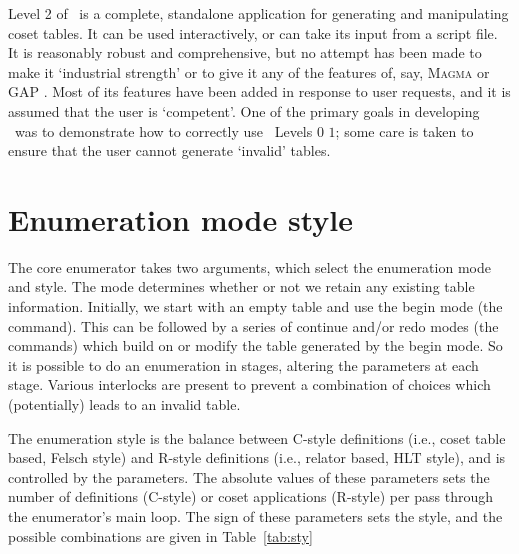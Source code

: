 


Level 2 of \ace\ is a complete, standalone application for generating and
  manipulating coset tables.
It can be used interactively, or can take its input from a script file.
It is reasonably robust and comprehensive, but no attempt has been made to
  make it `industrial strength' or to give it any of the features of, say,
  \textsc{Magma} \cite{Magma} or \textsf{GAP} \cite{GAP}.
Most of its features have been added in response to user requests, and it
  is assumed that the user is `competent'\kern-1.5pt.
One of the primary goals in developing \ace\ was to demonstrate how to
  correctly use \ace\ Levels $0$ \amp $1$; some care is taken to ensure
  that the user cannot generate `invalid' tables.

\section{Enumeration mode \amp style}\label{sec:style}

The core enumerator takes two arguments, which select the enumeration
  mode and style.
The mode determines whether or not we retain any existing table
  information.
Initially, we start with an empty table and use the begin mode (the
   command).
This can be followed by a series of continue and/or redo modes (the 
   \amp {} commands) which build on or modify the
  table generated by the begin mode.
So it is possible to do an enumeration in stages, altering the parameters
  at each stage.
Various interlocks are present to prevent a combination of choices which
  (potentially) leads to an invalid table.

The enumeration style is the balance between C-style definitions (i.e.,
  coset table based, Felsch style) and R-style definitions (i.e., relator
  based, HLT style), and is controlled by the  \amp {}
  parameters.
The absolute values of these parameters sets the number of definitions
  (C-style) or coset applications (R-style) per pass through the
  enumerator's main loop.
The sign of these parameters sets the style, and the possible combinations
  are given in Table~\ref{tab:sty}

